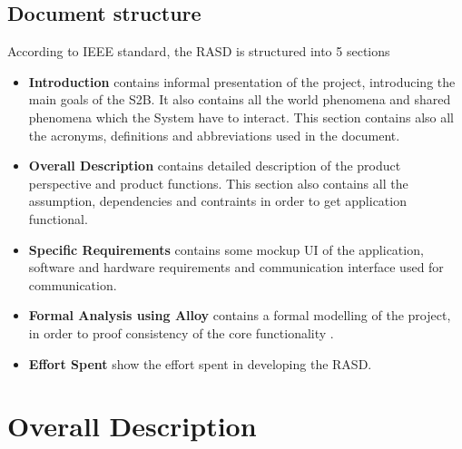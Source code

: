 \documentclass[a4paper, 12pt, oneside]{article}
\begin{document}
\subsection{Document structure}
According to IEEE standard, the RASD is structured into 5 sections
\begin{itemize}
    \item \textbf{Introduction} contains informal presentation of the project, introducing the main goals of the S2B. It also contains all the world phenomena and shared phenomena which the System have to interact. This section contains also all the acronyms, definitions and abbreviations used in the document.
    \item \textbf{Overall Description} contains detailed description of the product perspective and product functions. This section also contains all the assumption, dependencies and contraints in order to get application functional.
    \item \textbf{Specific Requirements} contains some mockup UI of the application, software and hardware requirements and communication interface used for communication.
    \item \textbf{Formal Analysis using Alloy} contains a formal modelling of the project, in order to proof consistency of the core functionality .
    \item \textbf{Effort Spent} show the effort spent in developing the RASD.
\end{itemize}

\newpage
\section{Overall Description}
\label{overallDescription}
\end{document}
